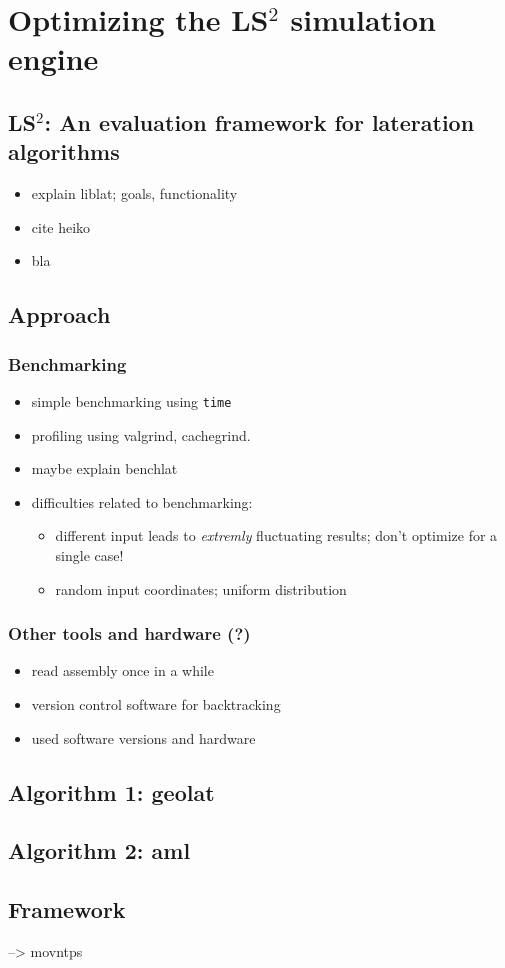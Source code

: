 \section{Optimizing the LS$^{2}$ simulation engine}
\label{Implementation}
\subsection{LS$^{2}$: An evaluation framework for lateration algorithms}
\begin{itemize}
\item explain liblat; goals, functionality
\item cite heiko
\item bla~\cite{will2012ls2}
\end{itemize}
\subsection{Approach}
\subsubsection{Benchmarking}
\begin{itemize}
\item simple benchmarking using \texttt{time}
\item profiling using valgrind, cachegrind.
\item maybe explain benchlat
\item difficulties related to benchmarking:
\begin{itemize}
\item different input leads to \emph{extremly} fluctuating results; don't optimize for a single case!
\item random input coordinates; uniform distribution
\end{itemize}
\end{itemize}
\subsubsection{Other tools and hardware (?)}
\begin{itemize}
\item read assembly once in a while 
\item version control software for backtracking
\item used software versions and hardware
\end{itemize}
\subsection{Algorithm 1: geolat}
\subsection{Algorithm 2: aml}
\subsection{Framework}
--> movntps